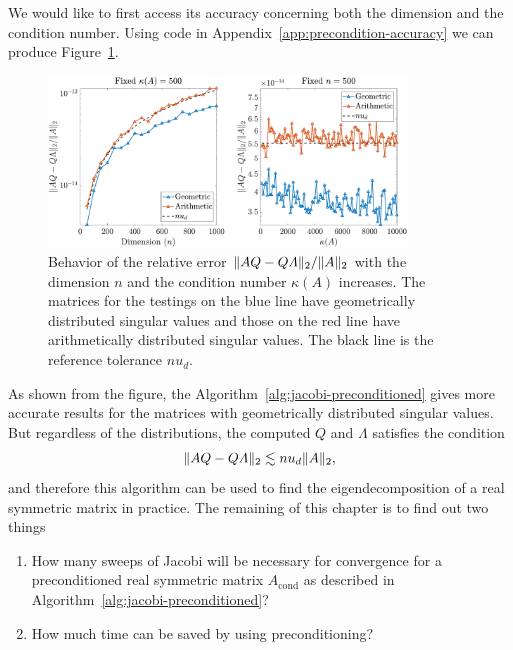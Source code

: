 We would like to first access its accuracy concerning both the dimension and the condition number. Using code in Appendix~\ref{app:precondition-accuracy} we can produce Figure~\ref{fig:precondition-accuracy}. 


\begin{figure}[ht]
  \centering
  \includegraphics[width=0.85\textwidth]{figs/accuracy_precondition.pdf}
  \caption[Behavior of the relative error $\norm{AQ-Q\varLambda}/\norm{A}$ where $A\in\R\nn$ is symmetric and $Q$ and $\varLambda$ are the results computed using Algorithm~\ref{alg:jacobi-preconditioned}.]{Behavior of the relative error $\norm{AQ-Q\varLambda}/\norm{A}$ with the dimension $n$ and the condition number $\kappa(A)$ increases. The matrices for the testings on the blue line have geometrically distributed singular values and those on the red line have arithmetically distributed singular values. The black line is the reference tolerance $nu_d$.}
  \label{fig:precondition-accuracy}
  \end{figure}
  

As shown from the figure, the Algorithm~\ref{alg:jacobi-preconditioned} gives more accurate results for the matrices with geometrically distributed singular values. But regardless of the distributions, the computed $Q$ and $\varLambda$ satisfies the condition 
\begin{equation}\notag
  \|{AQ - Q\varLambda}\|_2 \lesssim nu_d\|{A}\|_2,
\end{equation}
and therefore this algorithm can be used to find the eigendecomposition of a real symmetric matrix in practice. The remaining of this chapter is to find out two things
\begin{enumerate}
  \item How many sweeps of Jacobi will be necessary for convergence for a preconditioned real symmetric matrix $A_\text{cond}$ as described in Algorithm~\ref{alg:jacobi-preconditioned}?
  \item How much time can be saved by using preconditioning?
\end{enumerate}

